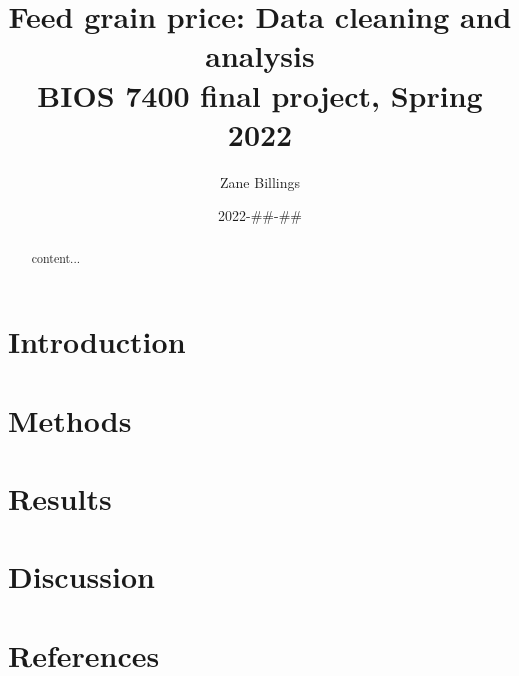 \documentclass[12pt]{article}
\title{
	Feed grain price: Data cleaning and analysis \\
	\Large BIOS 7400 final project, Spring 2022
}
\author{Zane Billings}
\date{2022-\#\#-\#\#}
\begin{document}
\maketitle

\begin{abstract}
	content...
\end{abstract}

\section*{Introduction}

\section*{Methods}

\section*{Results}

\section*{Discussion}

\section*{References}
\end{document}
